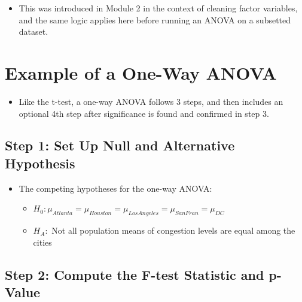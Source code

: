 \documentclass[
  letterpaper,
  DIV=11,
  numbers=noendperiod]{scrreprt}
\providecommand{\tightlist}{%
  \setlength{\itemsep}{0pt}\setlength{\parskip}{0pt}}\usepackage{longtable,booktabs,array}
\begin{document}
\begin{itemize}
\tightlist
\item
  This was introduced in Module 2 in the context of cleaning factor
  variables, and the same logic applies here before running an ANOVA on
  a subsetted dataset.
\end{itemize}

\section{Example of a One-Way ANOVA}\label{example-of-a-one-way-anova}

\begin{itemize}
\tightlist
\item
  Like the t-test, a one-way ANOVA follows 3 steps, and then includes an
  optional 4th step after significance is found and confirmed in step 3.
\end{itemize}

\subsection{Step 1: Set Up Null and Alternative
Hypothesis}\label{step-1-set-up-null-and-alternative-hypothesis}

\begin{itemize}
\tightlist
\item
  The competing hypotheses for the one-way ANOVA:

  \begin{itemize}
  \tightlist
  \item
    \(H_0: \mu_{Atlanta} = \mu_{Houston}= \mu_{LosAngeles} = \mu_{SanFran} = \mu_{DC}\)
  \item
    \(H_A:\) Not all population means of congestion levels are equal
    among the cities
  \end{itemize}
\end{itemize}

\subsection{Step 2: Compute the F-test Statistic and
p-Value}\label{step-2-compute-the-f-test-statistic-and-p-value}
\end{document}
